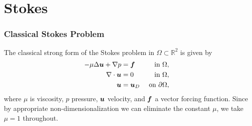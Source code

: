 \documentclass[mathserif]{beamer}
\newcommand{\vect}[1]{\ensuremath\boldsymbol{#1}}
\newcommand{\NVRgrad}{\nabla}
\newcommand{\NVRdiv}{\NVRgrad \cdot}
\begin{document}
\section{Stokes} %
\begin{frame}
\frametitle{Classical Stokes Problem}
The classical strong form of the Stokes problem in $\Omega \subset
\mathbb{R}^{2}$ is given by
\begin{align*}
- \mu \Delta \vect{u} + \NVRgrad p &= \vect{f} & \text{ in } \Omega, \\
\NVRdiv \vect{u} &= 0 & \text{ in } \Omega, \\
\vect{u} &= \vect{u}_D & \text{ on } \partial\Omega,
\end{align*}
where $\mu$ is viscosity, $p$ pressure, $\vect{u}$ velocity, and
$\vect{f}$ a vector forcing function.  Since by appropriate
non-dimensionalization we can eliminate the constant $\mu$, we take
$\mu=1$ throughout. 
\end{frame}
\end{document}
